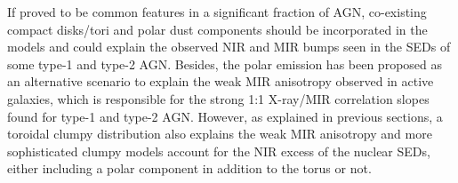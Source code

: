 \documentclass{natureprintstyle}
\def\micron{$\mu$m}
\begin{document}
If proved to be common features in a significant fraction of AGN, co-existing compact disks/tori and polar dust components {should be incorporated in the models\cite{Honig17}} and could explain the observed NIR and MIR bumps seen in the SEDs of some type-1\cite{Mor09,Alonso11,Ichikawa15} and type-2 AGN\cite{Lira13}. Besides, the polar emission has been proposed as an alternative scenario to explain {the weak MIR anisotropy observed in active galaxies\cite{Honig11},} which is responsible for the strong 1:1 X-ray/MIR correlation slopes found for type-1 and type-2 AGN\cite{Gandhi:2009pd,Ichikawa:2012uo,Asmus15}. However, as explained in previous sections, a toroidal clumpy distribution also explains the weak MIR anisotropy\cite{Levenson09} and more sophisticated clumpy models account for the NIR excess of the nuclear SEDs, {either including a polar component in addition to the torus\cite{Honig17} or not\cite{Stalevski12}.}







\end{document}

